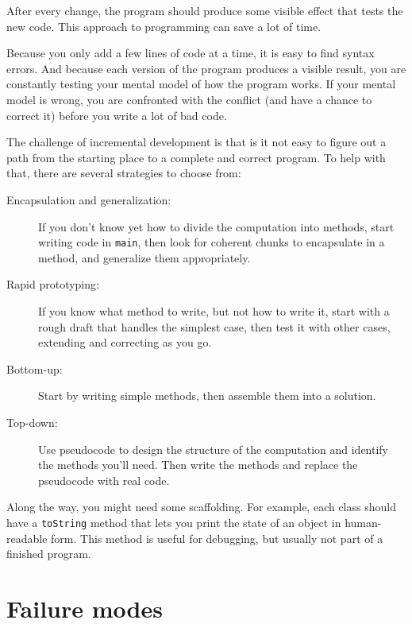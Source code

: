 \documentclass[12pt]{book}
\theoremstyle{exercise}
\begin{document}
After every change, the program should produce some visible effect
that tests the new code.  This approach to programming can save
a lot of time.

Because you only add a few lines of code at a time, it
is easy to find syntax errors.
%
And because each version of the
program produces a visible result, you are constantly testing your
mental model of how the program works.  If your mental model is
wrong, you are confronted with the conflict (and have a chance
to correct it) before you write a lot of bad code.

The challenge of incremental development is that is it not
easy to figure out a path from the starting place
to a complete and correct program.
%
To help with that, there are several strategies to choose from:

\begin{description}

\item[Encapsulation and generalization:] If you don't know yet how
to divide the computation into methods, start writing code in
{\tt main}, then look for coherent chunks to encapsulate in
a method, and generalize them appropriately.

\item[Rapid prototyping:] If you know what method to write, but not
how to write it, start with a rough draft that handles the simplest
case, then test it with other cases, extending and correcting as you go.

\item[Bottom-up:] Start by writing simple methods, then assemble them
into a solution.

\item[Top-down:] Use pseudocode to design the structure of the
computation and identify the methods you'll need.  Then write the
methods and replace the pseudocode with real code.

\end{description}

Along the way, you might need some scaffolding. For example, each
class should have a {\tt toString} method that lets you print the
state of an object in human-readable form.  This method is useful
for debugging, but usually not part of a finished program.

\section{Failure modes}
\end{document}
